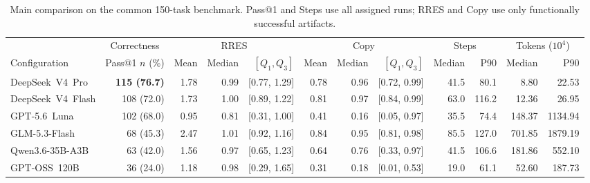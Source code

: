 \documentclass[acmsmall,screen,review,anonymous]{acmart}
\begin{document}
\begin{table}[htb]
  \caption{Main comparison on the common 150-task benchmark. Pass@1 and Steps
  use all assigned runs; RRES and Copy use only functionally successful artifacts.}
  \label{tab:main}

  \centering
  \footnotesize
  \setlength{\tabcolsep}{1.6pt}
  \renewcommand{\arraystretch}{1.12}

  \begin{tabular*}{\linewidth}{
    @{\extracolsep{\fill}}
    >{\raggedright\arraybackslash}p{2.65cm}
    r
    rrr
    rrr
    rr
    rr
    @{}
  }
    \toprule

    &
    \multicolumn{1}{c}{Correctness} &
    \multicolumn{3}{c}{RRES} &
    \multicolumn{3}{c}{Copy} &
    \multicolumn{2}{c}{Steps} &
    \multicolumn{2}{c}{Tokens ($10^4$)} \\

    \cmidrule(lr){2-2}
    \cmidrule(lr){3-5}
    \cmidrule(lr){6-8}
    \cmidrule(lr){9-10}
    \cmidrule(lr){11-12}

    Configuration
      & \shortstack{Pass@1\\$n$ (\%)}
      & Mean
      & Median
      & $[Q_1,Q_3]$
      & Mean
      & Median
      & $[Q_1,Q_3]$
      & Median
      & P90
      & Median
      & P90 \\

    \midrule
    \mbox{DeepSeek V4 Pro} & \textbf{115 (76.7)} & 1.78 & 0.99 & [0.77, 1.29] & 0.78 & 0.96 & [0.72, 0.99] & 41.5 & 80.1 & 8.80 & 22.53 \\
    \mbox{DeepSeek V4 Flash} & 108 (72.0) & 1.73 & 1.00 & [0.89, 1.22] & 0.81 & 0.97 & [0.84, 0.99] & 63.0 & 116.2 & 12.36 & 26.95 \\
    \mbox{GPT-5.6 Luna} & 102 (68.0) & 0.95 & 0.81 & [0.31, 1.00] & 0.41 & 0.16 & [0.05, 0.97] & 35.5 & 74.4 & 148.37 & 1134.94 \\
    \mbox{GLM-5.3-Flash} & 68 (45.3) & 2.47 & 1.01 & [0.92, 1.16] & 0.84 & 0.95 & [0.81, 0.98] & 85.5 & 127.0 & 701.85 & 1879.19 \\
    \mbox{Qwen3.6-35B-A3B} & 63 (42.0) & 1.56 & 0.97 & [0.65, 1.23] & 0.64 & 0.76 & [0.33, 0.97] & 41.5 & 106.6 & 181.86 & 552.10 \\
    \mbox{GPT-OSS 120B} & 36 (24.0) & 1.18 & 0.98 & [0.29, 1.65] & 0.31 & 0.18 & [0.01, 0.53] & 19.0 & 61.1 & 52.60 & 187.73 \\

    \bottomrule
  \end{tabular*}

\end{table}
\end{document}
